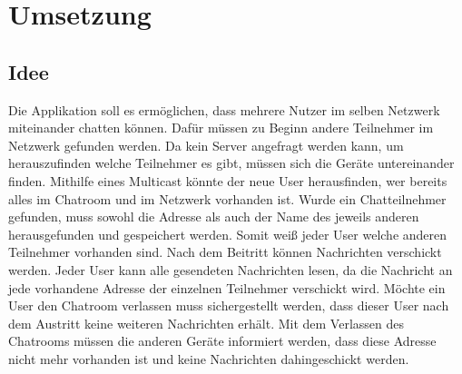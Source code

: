 \section{Umsetzung}
\subsection{Idee}
Die Applikation soll es ermöglichen, dass mehrere Nutzer im selben Netzwerk miteinander chatten können. 
Dafür müssen zu Beginn andere Teilnehmer im Netzwerk gefunden werden.
Da kein Server angefragt werden kann, um herauszufinden welche Teilnehmer es gibt, müssen sich die Geräte untereinander finden. Mithilfe eines Multicast könnte der neue User 
herausfinden, wer bereits alles im Chatroom und im Netzwerk vorhanden ist. 
Wurde ein Chatteilnehmer gefunden, muss sowohl die Adresse als auch der Name des jeweils anderen herausgefunden und gespeichert werden. 
Somit weiß jeder User welche anderen Teilnehmer vorhanden sind. 
Nach dem Beitritt können Nachrichten verschickt werden. Jeder User kann alle gesendeten Nachrichten lesen, da die Nachricht an jede vorhandene Adresse der einzelnen Teilnehmer verschickt wird.
Möchte ein User den Chatroom verlassen muss sichergestellt werden, dass dieser User nach dem Austritt keine weiteren Nachrichten erhält. 
Mit dem Verlassen des Chatrooms müssen die anderen Geräte informiert werden, dass diese Adresse nicht mehr vorhanden ist und keine Nachrichten dahingeschickt werden.
\\
